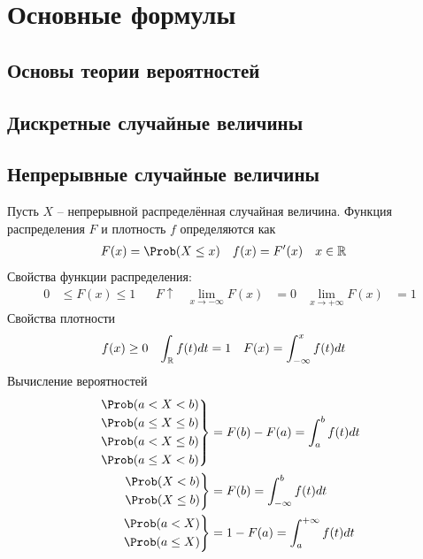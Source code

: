 
\section{Основные формулы}

\subsection{Основы теории вероятностей}

\subsection{Дискретные случайные величины}

\subsection{Непрерывные случайные величины}

Пусть \(X\) -- непрерывной распределённая случайная величина. Функция распределения \(F\) и плотность \(f\)
определяются как
\begin{align*}
	F(x)&=\Prob(X\leq x) & f(x)&=F'(x) & x&\in\R
\end{align*}
Свойства функции распределения:
\begin{align*}
	0&\leq F(x)\leq1 & &F \uparrow & 
	\lim_{x\to-\infty}F(x)&=0 & \lim_{x\to+\infty}F(x)&=1
\end{align*}
Свойства плотности
\begin{align*}
	f(x)&\geq 0 & \int_{\mathbb R} f(t)dt&=1 & F(x)&=\int_{-\infty}^x f(t)dt
\end{align*}
Вычисление вероятностей
\begin{align*}
	\left.\begin{aligned}
	&\Prob(a<X<b) \\ & \Prob(a\leq X\leq b) \\ 
	& \Prob(a<X\leq b) \\ &\Prob(a\leq X< b)
	\end{aligned}
	\right\}&=F(b)-F(a)=\int_a^b f(t)dt\\
	\left.\begin{aligned}
	&\Prob(X<b) \\ & \Prob(X\leq b)
	\end{aligned}
	\right\}&=F(b)=\int_{-\infty}^b f(t)dt\\
	\left.\begin{aligned}
	&\Prob(a<X) \\ & \Prob(a\leq X)
	\end{aligned}
	\right\}&=1-F(a)=\int_{a}^{+\infty} f(t)dt
\end{align*}